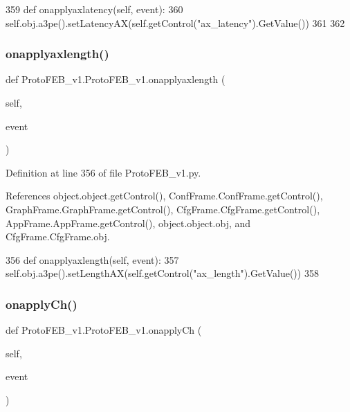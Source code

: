 \begin{DoxyCode}
359     \textcolor{keyword}{def }onapplyaxlatency(self, event):
360         self.obj.a3pe().setLatencyAX(self.getControl(\textcolor{stringliteral}{"ax\_latency"}).GetValue())
361 
362 
\end{DoxyCode}
\mbox{\label{classProtoFEB__v1_1_1ProtoFEB__v1_a3f04a3f93366082ad95de91d1457fdf5}} 
\subsubsection{\texorpdfstring{onapplyaxlength()}{onapplyaxlength()}}
{\footnotesize\ttfamily def Proto\+F\+E\+B\+\_\+v1.\+Proto\+F\+E\+B\+\_\+v1.\+onapplyaxlength (\begin{DoxyParamCaption}\item[{}]{self,  }\item[{}]{event }\end{DoxyParamCaption})}



Definition at line 356 of file Proto\+F\+E\+B\+\_\+v1.\+py.



References object.\+object.\+get\+Control(), Conf\+Frame.\+Conf\+Frame.\+get\+Control(), Graph\+Frame.\+Graph\+Frame.\+get\+Control(), Cfg\+Frame.\+Cfg\+Frame.\+get\+Control(), App\+Frame.\+App\+Frame.\+get\+Control(), object.\+object.\+obj, and Cfg\+Frame.\+Cfg\+Frame.\+obj.


\begin{DoxyCode}
356     \textcolor{keyword}{def }onapplyaxlength(self, event):
357         self.obj.a3pe().setLengthAX(self.getControl(\textcolor{stringliteral}{"ax\_length"}).GetValue())
358 
\end{DoxyCode}
\mbox{\label{classProtoFEB__v1_1_1ProtoFEB__v1_a1dcbf839bbd6f33c1b9de47749d98626}} 
\subsubsection{\texorpdfstring{onapply\+Ch()}{onapplyCh()}}
{\footnotesize\ttfamily def Proto\+F\+E\+B\+\_\+v1.\+Proto\+F\+E\+B\+\_\+v1.\+onapply\+Ch (\begin{DoxyParamCaption}\item[{}]{self,  }\item[{}]{event }\end{DoxyParamCaption})}



